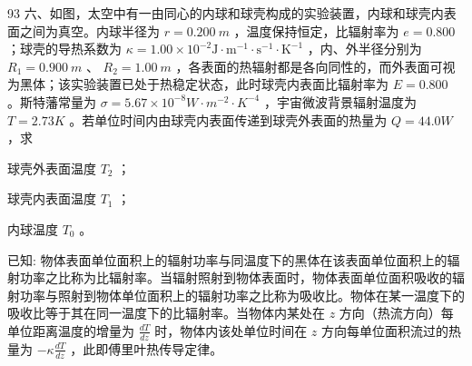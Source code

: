 \begin{problem}[第35届全国中学生物理竞赛复赛][热辐射与热传导]{93}
六、如图，太空中有一由同心的内球和球壳构成的实验装置，内球和球壳内表面之间为真空。内球半径为 $r=0.200\ m$ ，温度保持恒定，比辐射率为 $e=0.800$；球壳的导热系数为 $\kappa=1.00\times10^{-2}\mathrm{J}\cdot\mathrm{m}^{-1}\cdot\mathrm{s}^{-1}\cdot\mathrm{K}^{-1}$ ，内、外半径分别为 $R_{1}=0.900\ m$ 、 $R_{2}=1.00\ m$ ，各表面的热辐射都是各向同性的，而外表面可视为黑体；该实验装置已处于热稳定状态，此时球壳内表面比辐射率为 $E=0.800$ 。斯特藩常量为 $\sigma=5.67\times10^{-8}W\cdot m^{-2}\cdot K^{-4}$ ，宇宙微波背景辐射温度为 $T=2.73K$ 。若单位时间内由球壳内表面传递到球壳外表面的热量为 $Q=44.0W$，求
\begin{subproblem}
球壳外表面温度 $T_{2}$ ；
\end{subproblem}
\begin{subproblem}
球壳内表面温度 $T_{1}$ ；
\end{subproblem}
\begin{subproblem}
内球温度 $T_{0}$ 。
\end{subproblem}
已知: 物体表面单位面积上的辐射功率与同温度下的黑体在该表面单位面积上的辐射功率之比称为比辐射率。当辐射照射到物体表面时，物体表面单位面积吸收的辐射功率与照射到物体单位面积上的辐射功率之比称为吸收比。物体在某一温度下的吸收比等于其在同一温度下的比辐射率。当物体内某处在 $z$ 方向（热流方向）每单位距离温度的增量为 $\frac{dT}{dz}$ 时，物体内该处单位时间在 $z$ 方向每单位面积流过的热量为 $-\kappa\frac{dT}{dz}$ ，此即傅里叶热传导定律。
\end{problem}

